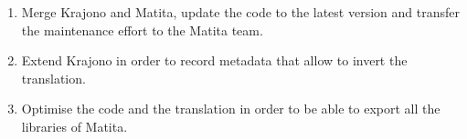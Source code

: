 




\begin{enumerate}

  \item Merge Krajono and Matita, update the code to the latest
  version and transfer the maintenance effort to the Matita team.

  \item Extend Krajono in order to record metadata that allow to
  invert the translation.

  \item Optimise the code and the translation in order to be able to
  export all the libraries of Matita.
\end{enumerate}


